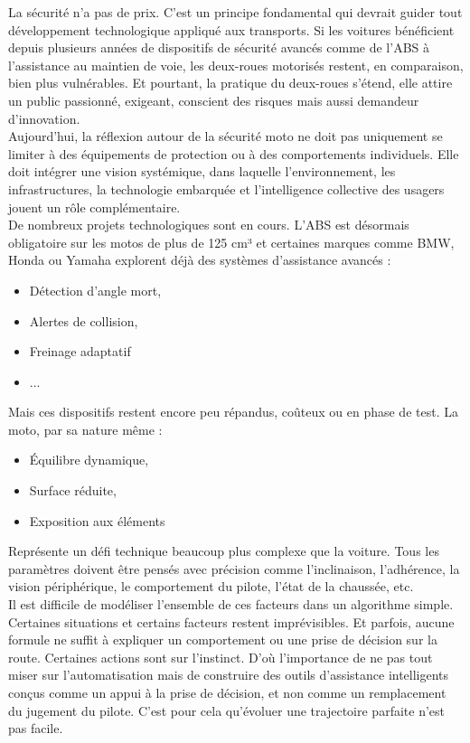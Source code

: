 La sécurité n’a pas de prix. C’est un principe fondamental qui devrait guider tout développement technologique appliqué aux transports. Si les voitures bénéficient depuis plusieurs années de dispositifs de sécurité avancés comme de l’ABS à l’assistance au maintien de voie, les deux-roues motorisés restent, en comparaison, bien plus vulnérables. Et pourtant, la pratique du deux-roues s’étend, elle attire un public passionné, exigeant, conscient des risques mais aussi demandeur d’innovation.\\
Aujourd’hui, la réflexion autour de la sécurité moto ne doit pas uniquement se limiter à des équipements de protection ou à des comportements individuels. Elle doit intégrer une vision systémique, dans laquelle l’environnement, les infrastructures, la technologie embarquée et l’intelligence collective des usagers jouent un rôle complémentaire.\\
De nombreux projets technologiques sont en cours. L’ABS est désormais obligatoire sur les motos de plus de 125 cm³ et certaines marques comme BMW, Honda ou Yamaha explorent déjà des systèmes d’assistance avancés : 
\begin{itemize}
	\item Détection d’angle mort,
	\item Alertes de collision,
	\item Freinage adaptatif
	\item ...
\end{itemize}
Mais ces dispositifs restent encore peu répandus, coûteux ou en phase de test. La moto, par sa nature même :
\begin{itemize}
	\item Équilibre dynamique,
	\item Surface réduite,
	\item Exposition aux éléments
\end{itemize}
Représente un défi technique beaucoup plus complexe que la voiture. Tous les paramètres doivent être pensés avec précision comme l'inclinaison, l'adhérence, la vision périphérique, le comportement du pilote, l'état de la chaussée, etc.\\
Il est difficile de modéliser l’ensemble de ces facteurs dans un algorithme simple. Certaines situations et certains facteurs restent imprévisibles. Et parfois, aucune formule ne suffit à expliquer un comportement ou une prise de décision sur la route. Certaines actions sont sur l'instinct. D’où l’importance de ne pas tout miser sur l’automatisation mais de construire des outils d’assistance intelligents conçus comme un appui à la prise de décision, et non comme un remplacement du jugement du pilote. C'est pour cela qu'évoluer une trajectoire parfaite n'est pas facile.\\
